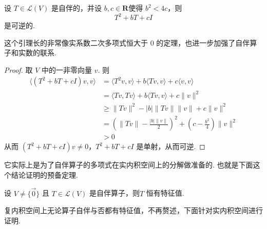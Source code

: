 \begin{lemma} \label{lem:24:实谱定理引理1}
    设 $ T \in \mathcal{L}(V) $ 是自伴的，并设 $ b, c \in \mathbf{R} $使得 $ b^2 < 4c $，则
    \[ T^2 + bT + cI \]
    是可逆的.
\end{lemma}

这个引理长的非常像实系数二次多项式恒大于 0 的定理，也进一步加强了自伴算子和实数的联系.

\begin{proof}
    取 $ V $ 中的一非零向量 $ v $. 则
    \begin{align*}
        \langle(T^2+bT+cI)v,v\rangle & = \langle T^2v,v \rangle + b\langle Tv,v \rangle + c\langle v,v \rangle                                  \\
                                     & = \langle Tv,Tv \rangle + b\langle Tv,v \rangle + c\lVert v \rVert^2                                     \\
                                     & \geqslant \lVert Tv \rVert^2 - \lvert b \rvert \lVert Tv \rVert \lVert v \rVert +  c\lVert v \rVert^2    \\
                                     & = \left(\lVert Tv \rVert - \frac{|b| \lVert v \rVert}{2}\right)^2 + (c - \frac{b^2}{4})\lVert v \rVert^2 \\
                                     & > 0
    \end{align*}
    从而 $ (T^2 + bT + cI)v \neq 0 $，$ T^2 + bT + cI $ 是单射，从而可逆.
\end{proof}

它实际上是为了自伴算子的多项式在实内积空间上的分解做准备的. 也就是下面这个结论证明的预备定理.

\begin{lemma} \label{lem:24:实谱定理引理2}
    设 $ V \neq \{ \vec{0} \} $ 且 $ T \in \mathcal{L}(V) $ 是自伴算子，则$ T $ 恒有特征值.
\end{lemma}

复内积空间上无论算子自伴与否都有特征值，不再赘述，下面针对实内积空间进行证明.

